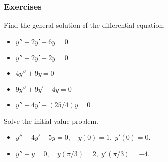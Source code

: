 \documentclass{beamer}
\begin{document}
\begin{frame}[t]\frametitle{Exercises}
    
    Find the general solution of the differential equation.
    \begin{itemize}
        \item $y'' - 2y' + 6y = 0$
        \item $y'' + 2y' + 2y = 0$
        \item $4y'' + 9y = 0$
        \item $9y'' + 9y' - 4y = 0$
        \item $y'' + 4y' + (25/4)y = 0$
    \end{itemize}
    Solve the initial value problem.
    \begin{itemize}
        \item $y'' + 4y' + 5y = 0, \quad y(0) = 1, \; y'(0) = 0.$
        \item $y'' + y = 0, \quad y(\pi/3) = 2, \; y'(\pi/3) = -4.$
    \end{itemize}
\end{frame}
\end{document}
